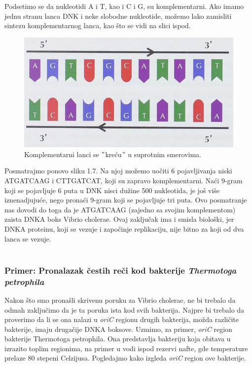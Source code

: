 Podsetimo se da nukleotidi A i T, kao i C i G, su komplementarni. Ako imamo jednu stranu lanca DNK i neke slobodne nukleotide, možemo lako zamisliti sintezu komplementarnog lanca, kao što se vidi na slici ispod. 

\begin{figure}[h]
\caption{Komplementarni lanci se $"$kreću$"$ u suprotnim smerovima.}
\centering
\includegraphics[width=1\textwidth]{poglavlja/1/slike/Komplementarni.png}
\end{figure} 

Posmatrajmo ponovo sliku 1.7. Na njoj možemo uočiti 6 pojavljivanja niski ATGATCAAG i CTTGATCAT, koji su zapravo komplementarni. Naći 9-gram koji se pojavljuje 6 puta u DNK nisci dužine 500 nukleotida, je još više iznenadjujuće, nego pronaći 9-gram koji se pojavljuje tri puta. Ovo posmatranje nas dovodi do toga da je ATGATCAAG (zajedno sa svojim komplementom) zaista DNKA boks Vibrio cholerae. Ovaj zaključak ima i smisla biološki, jer DNKA proteinu, koji se vezuje i započinje replikaciju, nije bitno za koji od dva lanca se vezuje.\\\\

\subsubsection{Primer: Pronalazak čestih reči kod bakterije \textit{Thermotoga petrophila}} 

Nakon što smo pronašli skrivenu poruku za Vibrio cholerae, ne bi trebalo da odmah zaključimo da je ta poruka ista kod svih bakterija. Najpre bi trebalo da proverimo da li se ona nalazi u \textit{oriC} regionu drugih bakterija, možda različite bakterije, imaju drugačije DNKA boksove. Uzmimo, za primer, \textit{oriC} region bakterije Thermotoga petrophila. Ona predstavlja bakteriju koja obitava u izrazito toplim regionima, na primer u vodi ispod rezervi nafte, gde temperature prelaze 80 stepeni Celzijusa. Pogledajmo kako izgleda \textit{oriC} region ove bakterije.


